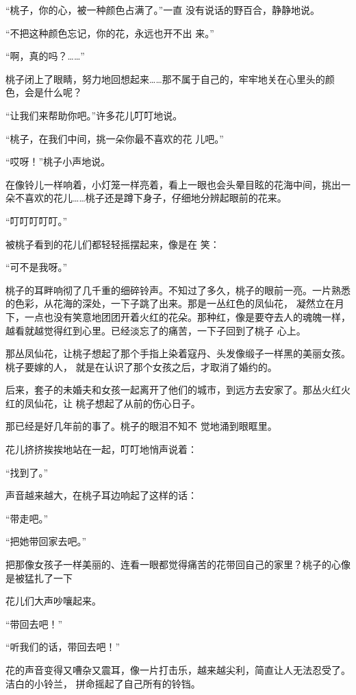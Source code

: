 \documentclass{article}
\begin{document}
“桃子，你的心，被一种颜色占满了。”一直
没有说话的野百合，静静地说。 

“不把这种颜色忘记，你的花，永远也开不出
来。” 


“啊，真的吗？……” 

桃子闭上了眼睛，努力地回想起来……那不属于自己的，牢牢地关在心里头的颜色，会是什么呢？

“让我们来帮助你吧。”许多花儿叮叮地说。

\newpage

“桃子，在我们中间，挑一朵你最不喜欢的花
儿吧。” 


“哎呀！”桃子小声地说。 

在像铃儿一样响着，小灯笼一样亮着，看上一眼也会头晕目眩的花海中间，挑出一朵不喜欢的花儿……桃子还是蹲下身子，仔细地分辨起眼前的花来。


“叮叮叮叮叮。” 


被桃子看到的花儿们都轻轻摇摆起来，像是在
笑： 


“可不是我呀。” 


桃子的耳畔响彻了几千重的细碎铃声。不知过了多久，桃子的眼前一亮。一片熟悉的色彩，从花海的深处，一下子跳了出来。那是一丛红色的凤仙花，
\newpage
凝然立在月下，一点也没有笑意地团团开着火红的花朵。那种红，像是要夺去人的魂魄一样，越看就越觉得红到心里。已经淡忘了的痛苦，一下子回到了桃子
心上。 

那丛凤仙花，让桃子想起了那个手指上染着寇丹、头发像缎子一样黑的美丽女孩。桃子要嫁的人，
就是在认识了那个女孩之后，才取消了婚约的。 

后来，套子的未婚夫和女孩一起离开了他们的城市，到远方去安家了。那丛火红火红的凤仙花，让
桃子想起了从前的伤心日子。 

那已经是好几年前的事了。桃子的眼泪不知不
觉地涌到眼眶里。 

花儿挤挤挨挨地站在一起，叮叮地悄声说着：


“找到了。” 


\newpage

声音越来越大，在桃子耳边响起了这样的话：


“带走吧。” 



“把她带回家去吧。” 

把那像女孩子一样美丽的、连看一眼都觉得痛苦的花带回自己的家里？桃子的心像是被猛扎了一下


花儿们大声吵嚷起来。 


“带回去吧！” 



“听我们的话，带回去吧！” 

花的声音变得又嘈杂又震耳，像一片打击乐，越来越尖利，简直让人无法忍受了。洁白的小铃兰，
拼命摇起了自己所有的铃铛。 
\end{document}
